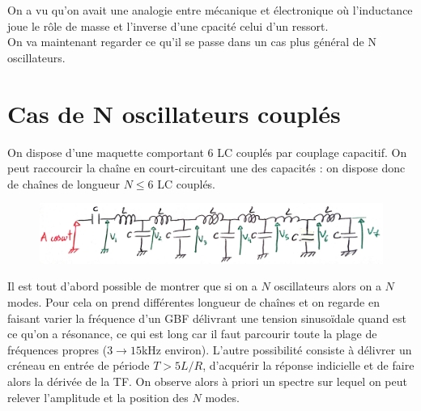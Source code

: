 \documentclass[12pt,prb,aps,epsf]{article}
\begin{document}
On a vu qu'on avait une analogie entre mécanique et électronique où l'inductance joue le rôle de masse et l'inverse d'une cpacité celui d'un ressort.\\
On va maintenant regarder ce qu'il se passe dans un cas plus général de N oscillateurs.

\section{Cas de N oscillateurs couplés}
On dispose d'une maquette comportant 6 LC couplés par couplage capacitif. On peut raccourcir la chaîne en court-circuitant une des capacités : on dispose donc de chaînes de longueur $N\leq 6$ LC couplés.
\begin{figure}[h]
	\centering \includegraphics[width=15cm]{N_osc_couples}
\end{figure}

Il est tout d'abord possible de montrer que si on a $N$ oscillateurs alors on a $N$ modes. Pour cela on prend différentes longueur de chaînes et on regarde en faisant varier la fréquence d'un GBF délivrant une tension sinusoïdale quand est ce qu'on a résonance, ce qui est long car il faut parcourir toute la plage de fréquences propres (3$\rightarrow15$kHz environ). L'autre possibilité consiste à délivrer un créneau en entrée de période $T>5L/R$, d'acquérir la réponse indicielle et de faire alors la dérivée de la TF. On observe alors à priori un spectre sur lequel on peut relever l'amplitude et la position des $N$ modes.\\
\end{document}
